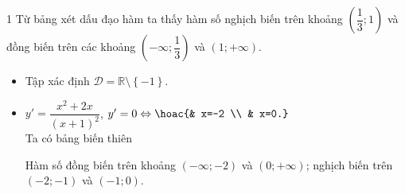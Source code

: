 \begin{bt}
{\begin{enumEX}{1}
			Từ bảng xét dấu đạo hàm ta thấy hàm số  nghịch biến trên khoảng $\left(\dfrac{1}{3};1\right)$ và đồng biến trên các khoảng $\left(-\infty;\dfrac{1}{3}\right)$ và $(1;+\infty)$.
			\item \begin{itemize}
			\item Tập xác định  $\mathscr{D}=\mathbb{R}\setminus \left\{-1\right\}$.
			\item $y'=\dfrac{x^2+2x}{(x+1)^2}$, $y'=0\Leftrightarrow \hoac{&  x=-2 \\ & x=0.}$\\
			Ta có  bảng biến thiên
			\begin{center}
			\end{center}
			Hàm số đồng biến trên khoảng  $\left( -\infty;-2\right)$ và $\left( 0;+\infty\right)$; nghịch biến trên $(-2;-1)$ và $(-1;0)$.
		\end{itemize}
	\end{enumEX}
 }
\end{bt}
